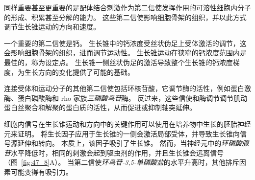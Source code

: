 同样重要甚至更重要的是配体结合刺激作为第二信使发挥作用的可溶性细胞内分子的形成、积累甚至分解的能力。
这些第二信使影响细胞骨架的组织，并以此方式调节生长锥运动的方向和速度。


一个重要的第二信使是钙。
生长锥中的钙浓度受丝状伪足上受体激活的调节，这会影响细胞骨架的组织，进而调节运动性。
生长锥运动在狭窄的钙浓度范围内是最佳的，称为设定点。
生长锥一侧丝状伪足的激活导致整个生长锥的钙浓度梯度，为生长方向的变化提供了可能的基础。


连接受体和运动分子的其他第二信使包括环核苷酸，它调节酶的活性，例如蛋白激酶、蛋白磷酸酶和 rho 家族\textit{三磷酸鸟苷}酶。
反过来，这些信使和酶调节调节肌动蛋白丝聚合和解聚的蛋白质的活性，从而促进或抑制轴突延伸。


细胞内信号在生长锥运动和方向中的关键作用可以使用在培养物中生长的胚胎神经元来证明。
将生长因子应用于生长锥的一侧会激活局部受体，并导致生长锥向信号源延伸和转向。
本质上，该因子吸引了生长锥。
然而，当神经元中的\textit{环磷酸腺苷}水平降低时，相同的刺激会起到驱虫剂的作用，并且生长锥会远离信号（图~\ref{fig:47_8}A）。
当第二信使\textit{环鸟苷-3,5-单磷酸盐}的水平升高时，其他排斥因素可能变得有吸引力。


